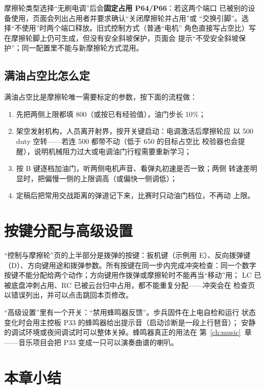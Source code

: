 \begin{note}
摩擦轮类型选择“无刷电调”后会\textbf{固定占用 P64/P66}：若这两个端口
已被别的设备使用，页面会列出占用者并要求确认“关闭摩擦轮并占用”或
“交换引脚”。选择“不使用”时两个端口释放。旧式控制方式（普通“电机”
角色直接写占空比）写在摩擦轮脚上仍可生成，但没有安全斜坡保护，页面会
提示“不受安全斜坡保护”；同一配置里不能与新摩擦轮方式混用。
\end{note}

\subsection{满油占空比怎么定}

满油占空比是摩擦轮唯一需要标定的参数，按下面的流程做：

\begin{enumerate}
  \item 先把两侧上限都填 800（或按已有经验值），油门步长 10\%；
  \item 架空发射机构，人员离开射界，按开关键启动：电调激活后摩擦轮应
        以 500 duty 空转——若连 500 都带不动（低于 650 的目标占空比
        校验器也会提醒），说明机械阻力过大或电调油门行程需要重新学习；
  \item 按 B 键逐档加油门，听两侧电机声音、看弹丸初速是否一致；两侧
        转速差明显时，把偏慢一侧的上限调高（或偏快一侧调低）；
  \item 定稿后把常用交战距离的弹道记下来，比赛时只动油门档位，不再动
        上限。
\end{enumerate}

\section{按键分配与高级设置}

“控制与摩擦轮”页的上半部分是拨弹的按键：扳机键（示例用 E）、反向拨弹键
（D）、方向键用途和拨弹参数。所有按键在同一步内完成冲突检查：同一个数字
按键不能分配给两个动作；方向键用作拨弹或摩擦轮时不能再当“移动”用；
LC 已被底盘冲刺占用、RC 已被云台归中占用，都不能重复分配——冲突会在
检查页以错误列出，并可以点击跳回本页修改。

“高级设置”里有一个开关：“禁用蜂鸣器反馈”。步兵固件在上电自检和运行
状态变化时会用主控板 P33 的蜂鸣器给出提示音（启动诊断是一段上行琶音）；
安静的调试环境或夜间调试时可以整体关掉。蜂鸣器真正的用法在
第~\ref{ch:music}~章——音乐项目会把 P33 变成一只可以演奏曲谱的喇叭。

\section{本章小结}

